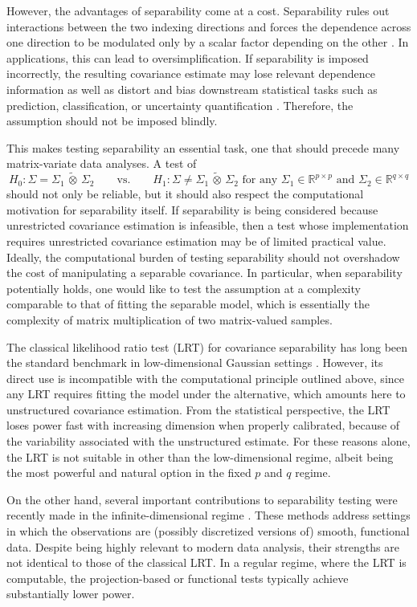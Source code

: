\documentclass[12pt]{article}
\newcommand{\R}{\mathbb{R}}
\newcommand{\ot}{\,\tilde\otimes\,}
\begin{document}
However, the advantages of separability come at a cost. Separability rules out interactions between the two indexing directions and forces the dependence across one direction to be modulated only by a scalar factor depending on the other \citep{gneiting2002,gneiting2006,rougier2017}. In applications, this can lead to oversimplification. If separability is imposed incorrectly, the resulting covariance estimate may lose relevant dependence information as well as distort and bias downstream statistical tasks such as prediction, classification, or uncertainty quantification \citep{aston2017tests,masak2023random}. Therefore, the assumption should not be imposed blindly.

This makes testing separability an essential task, one that should precede many matrix-variate data analyses. A test of
\[
H_0: \Sigma = \Sigma_1 \ot \Sigma_2 \qquad \text{vs.} \qquad H_1: \Sigma \neq \Sigma_1 \ot \Sigma_2 \text{ for any } \Sigma_1 \in \R^{p \times p}\text{ and } \Sigma_2 \in \R^{q \times q}
\]
should not only be reliable, but it should also respect the computational motivation for separability itself. If separability is being considered because unrestricted covariance estimation is infeasible, then a test whose implementation requires unrestricted covariance estimation may be of limited practical value. Ideally, the computational burden of testing separability should not overshadow the cost of manipulating a separable covariance. In particular, when separability potentially holds, one would like to test the assumption at a complexity comparable to that of fitting the separable model, which is essentially the complexity of matrix multiplication of two matrix-valued samples.

The classical likelihood ratio test (LRT) for covariance separability has long been the standard benchmark in low-dimensional Gaussian settings \citep{lu2005likelihood,MITCHELL2006}. However, its direct use is incompatible with the computational principle outlined above, since any LRT requires fitting the model under the alternative, which amounts here to unstructured covariance estimation. From the statistical perspective, the LRT loses power fast with increasing dimension when properly calibrated, because of the variability associated with the unstructured estimate. For these reasons alone, the LRT is not suitable in other than the low-dimensional regime, albeit being the most powerful and natural option in the fixed $p$ and $q$ regime.

On the other hand, several important contributions to separability testing were recently made in the infinite-dimensional regime \citep{aston2017tests, lynch2018,vanDelft2024general,dette2025testing}. These methods address settings in which the observations are (possibly discretized versions of) smooth, functional data. Despite being highly relevant to modern data analysis, their strengths are not identical to those of the classical LRT. In a regular regime, where the LRT is computable, the projection-based or functional tests typically achieve substantially lower power.
\end{document}
